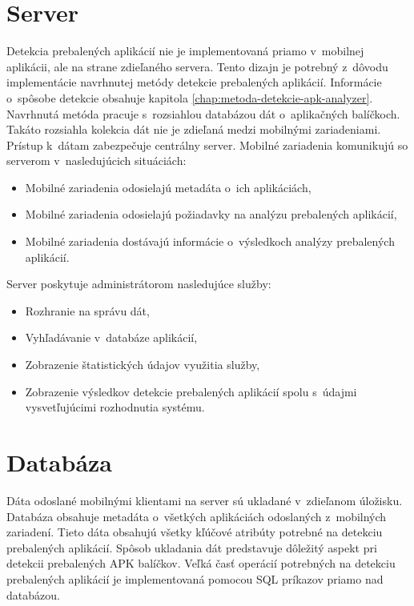 \section{Server}
Detekcia prebalených aplikácií nie je implementovaná priamo v~mobilnej aplikácii, ale na strane zdieľaného servera. Tento dizajn je potrebný z~dôvodu implementácie navrhnutej metódy detekcie prebalených aplikácií. Informácie o~spôsobe detekcie obsahuje kapitola \ref{chap:metoda-detekcie-apk-analyzer}. Navrhnutá metóda pracuje s~rozsiahlou databázou dát o~aplikačných balíčkoch. Takáto rozsiahla kolekcia dát nie je zdieľaná medzi mobilnými zariadeniami. Prístup k~dátam zabezpečuje centrálny server. 
\newline
\noindent Mobilné zariadenia komunikujú so serverom v~nasledujúcich situáciách:
\begin{itemize}
	\item Mobilné zariadenia odosielajú metadáta o~ich aplikáciách,
	\item Mobilné zariadenia odosielajú požiadavky na analýzu prebalených aplikácií,
	\item Mobilné zariadenia dostávajú informácie o~výsledkoch analýzy prebalených aplikácií.
\end{itemize}
Server poskytuje administrátorom nasledujúce služby:
\begin{itemize}
	\item Rozhranie na správu dát,
	\item Vyhľadávanie v~databáze aplikácií,
	\item Zobrazenie štatistických údajov využitia služby,
	\item Zobrazenie výsledkov detekcie prebalených aplikácií spolu s~údajmi vysvetľujúcimi rozhodnutia systému.
\end{itemize}

\section{Databáza}
Dáta odoslané mobilnými klientami na server sú ukladané v~zdieľanom úložisku. Databáza obsahuje metadáta o~všetkých aplikáciách odoslaných z~mobilných zariadení. Tieto dáta obsahujú všetky kľúčové atribúty potrebné na detekciu prebalených aplikácií. Spôsob ukladania dát predstavuje dôležitý aspekt pri detekcii prebalených APK balíčkov. Veľká časť operácií potrebných na detekciu prebalených aplikácií je implementovaná pomocou SQL príkazov priamo nad databázou. 